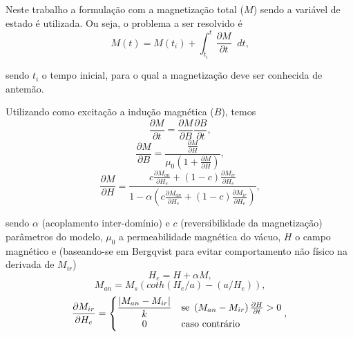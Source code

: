 \documentclass{homeworg}
\newcommand{\dx}{\mathop{}\!{d}}
\begin{document}
\hspace{1cm} Neste trabalho a formulação com a magnetização total ($M$) sendo a variável de estado é utilizada. Ou seja, o problema a ser resolvido é
\begin{equation}
  M(t) = M(t_i) + \int_{t_i}^{t} \frac{\partial M}{\partial t} \dx t \text{,}
\end{equation}

sendo $t_i$ o tempo inicial, para o qual a magnetização deve ser conhecida de antemão.

\hspace{1cm} Utilizando como excitação a indução magnética ($B$), temos \cite{dular, joe}
\begin{equation}
  \frac{\partial M}{\partial t} = \frac{\partial M}{\partial B} \frac{\partial B}{\partial t} \text{,}
\end{equation}
\begin{equation}
  \frac{\partial M}{\partial B} = \frac{\displaystyle \frac{\partial M}{\partial H}}{\displaystyle \mu_0 \left(1 + \frac{\partial M}{\partial H}\right)} \text{,}
\end{equation}
\begin{equation}
  \frac{\partial M}{\partial H} = \frac{\displaystyle c\frac{\partial M_{an}}{\partial H_e} + (1-c)\frac{\partial M_{ir}}{\partial H_e}}{\displaystyle 1 - \alpha \left( c\frac{\partial M_{an}}{\partial H_e} + (1-c)\frac{\partial M_{ir}}{\partial H_e}\right)} \text{,}
\end{equation}

sendo $\alpha$ (acoplamento inter-domínio) e $c$ (reversibilidade da magnetização) parâmetros do modelo, $\mu_0$ a permeabilidade magnética do vácuo, $H$ o campo magnético e (baseando-se em Bergqvist \cite{dular} para evitar comportamento não físico na derivada de $M_{ir}$)
\begin{equation}
  H_e = H + \alpha M \text{,}
\end{equation}
\begin{equation}
  M_{an} = M_s \left(coth(H_e/a) - (a/H_e)\right) \text{,}
\end{equation}
\begin{equation} \label{dmir}
  \frac{\partial M_{ir}}{\partial H_e} = \begin{cases}
    \displaystyle \frac{\lvert M_{an} - M_{ir} \rvert}{k} & \text{se } \left(M_{an} - M_{ir}\right) \frac{\partial H}{\partial t} > 0 \\
    \displaystyle\hfil 0 & \text{caso contrário}
  \end{cases} \text{,}
\end{equation}
\end{document}
